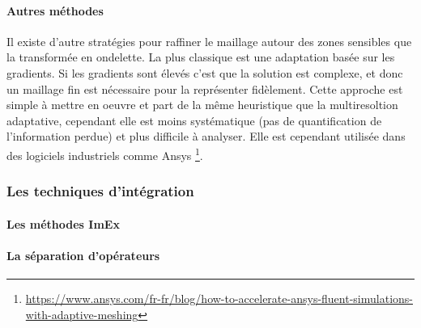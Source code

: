         \paragraph{Autres méthodes}
        Il existe d'autre stratégies pour raffiner le maillage autour des zones sensibles que la transformée en ondelette. 
        La plus classique est une adaptation basée sur les gradients. Si les gradients sont élevés c'est que la solution est complexe,
        et donc un maillage fin est nécessaire pour la représenter fidèlement. Cette approche est simple à mettre en oeuvre et part de la même heuristique 
        que la multiresoltion adaptative, cependant elle est moins systématique (pas de quantification de l'information perdue) et plus difficile à analyser. 
        Elle est cependant utilisée dans des logiciels industriels comme Ansys 
        \footnote{\href{https://www.ansys.com/fr-fr/blog/how-to-accelerate-ansys-fluent-simulations-with-adaptive-meshing}{https://www.ansys.com/fr-fr/blog/how-to-accelerate-ansys-fluent-simulations-with-adaptive-meshing}}.

    \subsubsection{Les techniques d'intégration}
        \paragraph{Les méthodes ImEx}
        \paragraph{La séparation d'opérateurs}